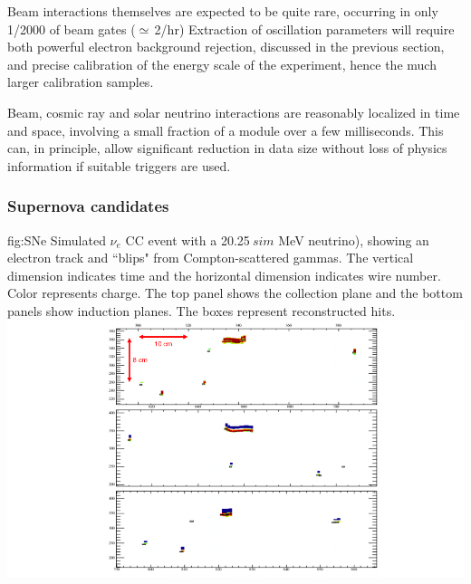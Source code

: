 \documentclass[../main-v1.tex]{subfiles}
\begin{document}
Beam interactions themselves are expected to be quite rare, occurring in only 1/2000 of beam gates ($\simeq$\,2/hr)  Extraction of oscillation parameters will require both powerful electron background rejection, discussed in the previous section,  and precise calibration of the energy scale of the experiment, hence the much larger calibration samples.

Beam, cosmic ray and solar neutrino interactions are reasonably localized in time and space, involving a small fraction of a module over a few milliseconds.  This can, in principle, allow significant reduction in data size without loss of physics information if suitable triggers are used.



\subsubsection{Supernova candidates }\label{sec:supernova}



\begin{dunefigure}
{fig:SNe} %
{
 Simulated $\nu_e$
 CC event with a 20.25$~sim$ MeV neutrino), showing an electron track and ``blips" from Compton-scattered gammas. The vertical dimension indicates time and the horizontal dimension indicates wire number. Color represents charge. The top panel shows the collection plane and the bottom panels show induction planes. The boxes represent reconstructed hits. }
\includegraphics[width=\textwidth]{graphics/IntroFigures/nueCC_20-25MeV_event25_2.png} %
\end{dunefigure}
\end{document}

